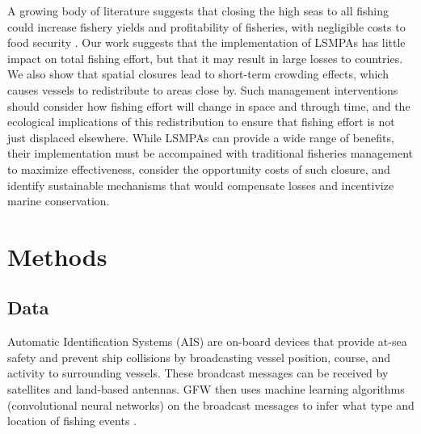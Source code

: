 \documentclass[9p,twocolumn,twoside,lineno]{pnas-new}
\begin{document}
A growing body of literature suggests that closing the high seas to all fishing could increase fishery yields and profitability of fisheries, with negligible costs to food security \citep{white_2014,sumaila_2015,sala_2018a,schiller_2018}. Our work suggests that the implementation of LSMPAs has little impact on total fishing effort, but that it may result in large losses to countries. We also show that spatial closures lead to short-term crowding effects, which causes vessels to redistribute to areas close by. Such management interventions should consider how fishing effort will change in space and through time, and the ecological implications of this redistribution to ensure that fishing effort is not just displaced elsewhere. While LSMPAs can provide a wide range of benefits, their implementation must be accompained with traditional fisheries management to maximize effectiveness, consider the opportunity costs of such closure, and identify sustainable mechanisms that would compensate losses and incentivize marine conservation.

\section{Methods}

\subsection{Data}

Automatic Identification Systems (AIS) are on-board devices that provide at-sea safety and prevent ship collisions by broadcasting vessel position, course, and activity to surrounding vessels. These broadcast messages can be received by satellites and land-based antennas. GFW then uses machine learning algorithms (convolutional neural networks) on the broadcast messages to infer what type and location of fishing events \citep{kroodsma_2018}.

\end{document}
